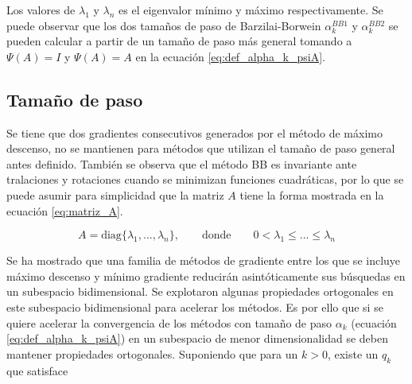 Los valores de $\lambda_1$ y $\lambda_n$ es el eigenvalor mínimo y máximo respectivamente. Se puede observar que los dos tamaños de paso de Barzilai-Borwein $\alpha_k^{BB1}$ y $\alpha_k^{BB2}$ se pueden calcular a partir de un tamaño de paso más general tomando a $\Psi(A) = I$ y $\Psi(A) = A$ en la ecuación \ref{eq:def_alpha_k_psiA}.


\subsection*{Tamaño de paso}


Se tiene que dos gradientes consecutivos generados por el método de máximo descenso, no se mantienen para métodos que utilizan el tamaño de paso general antes definido. También se observa que el método BB es invariante ante tralaciones y rotaciones cuando se minimizan funciones cuadráticas\cite{dai_2005}, por lo que se puede asumir para simplicidad que la matriz $A$ tiene la forma mostrada en la ecuación \ref{eq:matriz_A}.

\begin{equation}
    A = \text{diag}\{\lambda_1, ..., \lambda_n\}, \qquad \text{donde} \qquad 0<\lambda_1\leq...\leq\lambda_n \label{eq:matriz_A}
\end{equation}


Se ha mostrado que una familia de métodos de gradiente entre los que se incluye máximo descenso y mínimo gradiente reducirán asintóticamente sus búsquedas en un subespacio bidimensional. Se explotaron algunas propiedades ortogonales en este subespacio bidimensional para acelerar los métodos\cite{huang_2022}. %
Es por ello que si se quiere acelerar la convergencia de los métodos con tamaño de paso $\alpha_k$ (ecuación \ref{eq:def_alpha_k_psiA}) en un subespacio de menor dimensionalidad se deben mantener propiedades ortogonales. Suponiendo que para un $k>0$, existe un $q_k$ que satisface

